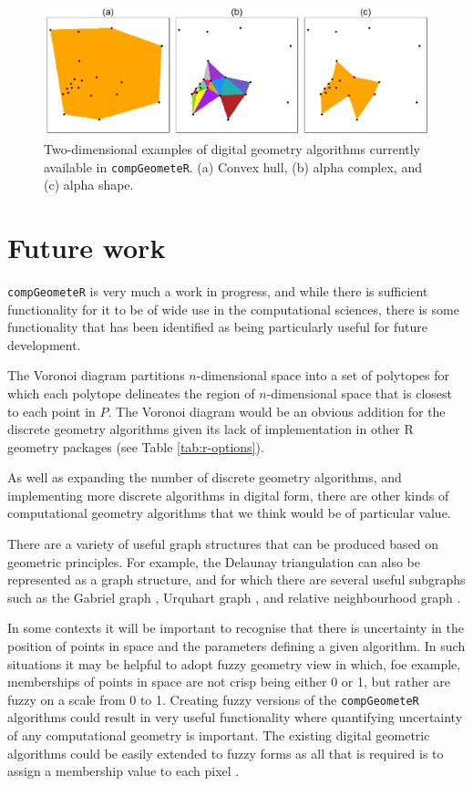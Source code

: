 \documentclass[12pt, a4paper]{article}
\begin{document}
\begin{figure}[ht]
\centering
\includegraphics{figures/digital-algorithms/digital-algorithms.png}
\caption{Two-dimensional examples of digital geometry algorithms currently available in \texttt{compGeometeR}. (a) Convex hull, (b) alpha complex, and (c) alpha shape.}
\label{fig:digital-algorithms}
\end{figure}

\section{Future work}

\texttt{compGeometeR} is very much a work in progress, and while there is sufficient functionality for it to be of wide use in the computational sciences, there is some functionality that has been identified as being particularly useful for future development.

The Voronoi diagram \citep{voronoi-1908, okabe-2000} partitions $n$-dimensional space into a set of polytopes for which each polytope delineates the region of $n$-dimensional space that is closest to each point in $P$.  The Voronoi diagram would be an obvious addition for the discrete geometry algorithms given its lack of implementation in other R geometry packages (see Table \ref{tab:r-options}).

As well as expanding the number of discrete geometry algorithms, and implementing more discrete algorithms in digital form, there are other kinds of computational geometry algorithms that we think would be of particular value.

There are a variety of useful graph structures that can be produced based on geometric principles.  For example, the Delaunay triangulation \citep{delaunay-1934} can also be represented as a graph structure, and for which there are several useful subgraphs such as the Gabriel graph \citep{gabriel-1969}, Urquhart graph \citep{urquhart-1980}, and relative neighbourhood graph \citep{toussaint-1980}.

In some contexts it will be important to recognise that there is uncertainty in the position of points in space and the parameters defining a given algorithm.  In such situations it may be helpful to adopt fuzzy geometry \citep{rosenfeld-1998} view in which, foe example, memberships of points in space are not crisp being either 0 or 1, but rather are fuzzy on a scale from 0 to 1.  Creating fuzzy versions of the \texttt{compGeometeR} algorithms could result in very useful functionality where quantifying uncertainty of any computational geometry is important.  The existing digital geometric algorithms could be easily extended to fuzzy forms as all that is required is to assign a membership value to each pixel \citep{klette-2004}.
\end{document}
